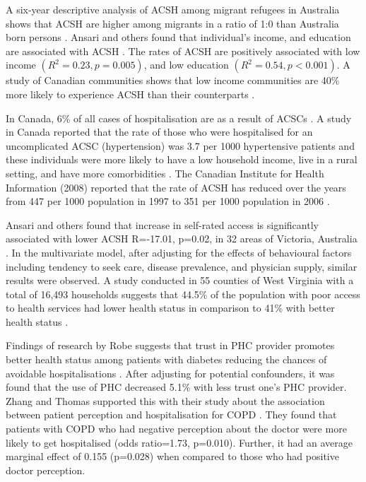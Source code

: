 A six-year descriptive analysis of ACSH among migrant refugees in Australia shows that ACSH are higher among migrants in a ratio of 1:0 than Australia born persons \cite{correa2007six}. Ansari and others found that individual's income, and education are associated with ACSH \cite{ansari2006access}. The rates of ACSH are positively associated with low income $(R^2=0.23, p=0.005)$, and low education $(R^2=0.54, p<0.001)$. A study of Canadian communities shows that low income communities are 40\% more likely to experience ACSH than their counterparts \cite{billings1996recent}. 

In Canada, 6\% of all cases of hospitalisation are as a result of ACSCs \cite{sanmartin2011hospitalizations}. 
A study in Canada reported that the rate of those who were hospitalised for an uncomplicated ACSC (hypertension) was 3.7 per 1000 hypertensive patients and these individuals were more likely to have a low household income, live in a rural setting, and have more comorbidities \cite{walker2013hospitalization}. The Canadian Institute for Health Information (2008) reported that the rate of ACSH has reduced over the years from 447 per 1000 population in 1997 to 351 per 1000 population in 2006 \cite{Canada:ACSC:2008}.

Ansari and others found that increase in self-rated access is significantly associated with lower ACSH R=-17.01, p=0.02, in 32 areas of Victoria, Australia \cite{ansari2006access}. In the multivariate model, after adjusting for the effects of behavioural factors including tendency to seek care, disease prevalence, and physician supply, similar results were observed. A study conducted in 55 counties of West Virginia with a total of 16,493 households suggests that 44.5\% of the population with poor access to health services had lower health status in comparison to 41\% with better health status \cite{liu2007health}. 

Findings of research by Robe suggests that trust in PHC provider promotes better health status among patients with diabetes reducing the chances of avoidable hospitalisations \cite{robe2016dismissingness}. After adjusting for potential confounders, it was found that the use of PHC decreased 5.1\% with less trust one’s PHC provider. Zhang and Thomas supported this with their study about the association between patient perception and hospitalisation for COPD \cite{zhang2017patient}. They found that patients with COPD who had negative perception about the doctor were more likely to get hospitalised (odds ratio=1.73, p=0.010). Further, it had an average marginal effect of 0.155 (p=0.028) when compared to those who had positive doctor perception.

